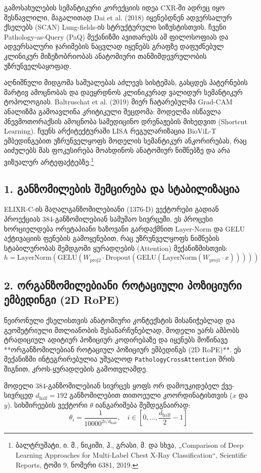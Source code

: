 \documentclass[12pt,a4paper,oneside]{report}
\begin{document}
გამოსახულების სემანტიკური კორექციის იდეა CXR-ში ადრეც იყო შესწავლილი, მაგალითად Dai et al. (2018) იყენებდნენ ადვერსალურ ქსელებს (SCAN) Lung-fields-ის სტრუქტურული სიზუსტისთვის. ჩვენი Pathology-as-Query (PaQ) მექანიზმი ავითარებს ამ ფილოსოფიას და ადვერსალური ჯარიმების ნაცვლად იყენებს გრაფზე დაფუძნებულ კლინიკურ მიზეზობრიობას ანატომიური თანმიმდევრულობის უზრუნველსაყოფად.

აღნიშნული მიდგომა საშუალებას აძლევს სისტემას, გასცდეს პატერნების მარტივ ამოცნობას და დაეყრდნოს კლინიკურად ვალიდურ სემანტიკურ ტოპოლოგიას. Baltruschat et al. (2019) მიერ ჩატარებულმა Grad-CAM ანალიზმა გამოავლინა კრიტიკული შეცდომა: მოდელმა ისწავლა პნევმოთორაქსის ამოცნობა სამედიცინო დრენაჟების მიხედვით (Shortcut Learning). ჩვენს არქიტექტურაში LISA რეგულარიზაცია BioViL-T ემბედინგებით უზრუნველყოფს მოდელის სემანტიკურ ანკორირებას, რაც აიძულებს მას ფოკუსირება მოახდინოს ანატომიურ ნიშნებზე და არა ვიზუალურ არტეფაქტებზე.\footnote{ბალტრუშატი, ი. მ., ნიკიში, ჰ., გრასი, მ. და სხვა, „Comparison of Deep Learning Approaches for Multi-Label Chest X-Ray Classification“, Scientific Reports, ტომი 9, ნომერი 6381, 2019.}

\subsection{1. განზომილების შემცირება და სტაბილიზაცია}
ELIXR-C-ის მაღალგანზომილებიანი (1376-D) ვექტორები გადიან პროექციას 384-განზომილებიან სამუშაო სივრცეში. ეს პროცესი ხორციელდება ორეტაპიანი ხაზოვანი გარდაქმნით Layer-Norm და GELU აქტივაციის ფენების გამოყენებით, რაც უზრუნველყოფს ნიშნების სტაბილურობას შემდგომი ყურადღების (Attention) მექანიზმისთვის:
\begin{equation}
h = \text{LayerNorm}(\text{GELU}(W_{\text{proj2}} \cdot \text{Dropout}(\text{GELU}(\text{LayerNorm}(W_{\text{proj1}} \cdot x)))))
\end{equation}

\subsection{2. ორგანზომილებიანი როტაციული პოზიციური ემბედინგი (2D RoPE)}
ნეირონული ქსელისთვის ანატომიური კონტექსტის მისანიჭებლად და გეომეტრიული მთლიანობის შესანარჩუნებლად, მოდელი უარს ამბობს ტრადიციულ ადიტიურ პოზიციურ კოდირებაზე და იყენებს მოწინავე **ორგანზომილებიან როტაციულ პოზიციურ ემბედინგს (2D RoPE)**. ეს მექანიზმი ინტეგრირებულია უშუალოდ \texttt{PathologyCrossAttention} შრის შიგნით, კროს-ყურადღების გამოთვლამდე.

მოდელი $384$-განზომილებიან სივრცეს ყოფს ორ დამოუკიდებელ ქვე-სივრცედ $d_{\text{half}} = 192$ განზომილებით თითოეული კოორდინატისთვის ($x$ და $y$). სიხშირეების ვექტორი $\theta$ იანგარიშება შემდეგნაირად:
\begin{equation}
\theta_i = \frac{1}{10000^{2i / d_{\text{half}}}}, \quad i \in \left[0, \dots, \frac{d_{\text{half}}}{2}-1\right]
\end{equation}
\end{document}
